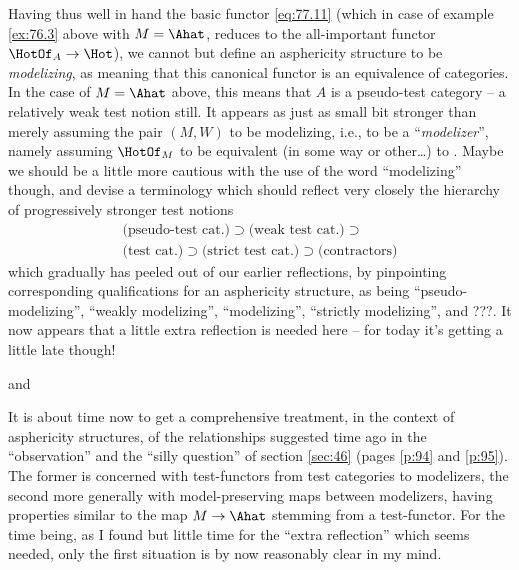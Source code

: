 Having thus well in hand the basic functor \eqref{eq:77.11} (which in
case of example \ref{ex:76.3} above with $M=\Ahat$, reduces to the
all-important functor $\HotOf_A\to\Hot$), we cannot but define an
asphericity structure to be \emph{modelizing}, as meaning that this
canonical functor is an equivalence of categories. In the case of
$M=\Ahat$ above, this means that $A$ is a pseudo-test category -- a
relatively weak test notion still. It appears as just as small bit
stronger than merely assuming the pair $(M,W)$ to be modelizing, i.e.,
to be a ``\emph{modelizer}'', namely assuming $\HotOf_M$ to be
equivalent (in some way or other\ldots) to \Hot. Maybe we should be a
little more cautious with the use of the word ``modelizing'' though,
and devise a terminology which should reflect very closely the
hierarchy of progressively stronger test notions
\begin{multline*}
  \text{(pseudo-test cat.)}
  \supset
  \text{(weak test cat.)}
  \supset\\
  \text{(test cat.)}
  \supset
  \text{(strict test cat.)}
  \supset
  \text{(contractors)}
\end{multline*}
which gradually has peeled out of our earlier reflections, by
pinpointing corresponding qualifications for an asphericity structure,
as being ``pseudo-modelizing'', ``weakly modelizing'', ``modelizing'',
``strictly modelizing'', and ???. It now appears that a little extra
reflection is needed here -- for today it's getting a little late
though!

\bigbreak
\presectionfill{} and \par

\label{sec:78}%
It is about time now to get a comprehensive treatment, in the context
of asphericity structures, of the relationships suggested time ago in
the ``observation'' and the ``silly question'' of section \ref{sec:46}
(pages \ref{p:94} and \ref{p:95}). The former is concerned with
test-functors from test categories to modelizers, the second more
generally with model-preserving maps between modelizers, having
properties similar to the map $M\to\Ahat$ stemming from a
test-functor. For the time being, as I found but little time for the
``extra reflection'' which seems needed, only the first situation is
by now reasonably clear in my mind.

